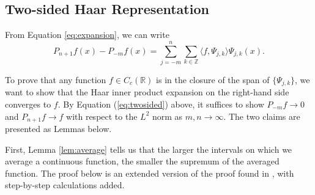 \documentclass[11pt]{amsart}
\theoremstyle{theorem} %
\theoremstyle{definition}
\theoremstyle{example}
\theoremstyle{remark}
\numberwithin{equation}{section}
\newcommand{\R}{\mathbb{R}}
\newcommand{\Z}{\mathbb{Z}}
\begin{document}
\subsection{Two-sided Haar Representation} \label{subsec:two-sided}
From Equation \ref{eq:expansion}, we can write
\begin{equation} \label{eq:twosided}
	P_{n+1}f(x) - P_{-m}f(x) = \sum_{j=-m}^{n} \sum_{k \in \Z} \langle f, \varPsi_{j,k} \rangle \varPsi_{j,k}(x).
\end{equation}

To prove that any function $ f \in C_c(\R) $ is in the closure of the span of $ \{ \varPsi_{j,k} \} $, we want to show that the Haar inner product expansion on the right-hand side converges to $ f $. By Equation (\ref{eq:twosided}) above, it suffices to show $ P_{-m}f \to 0 $ and $ P_{n+1}f \to f $ with respect to the $ L^2 $ norm as $ m, n \to \infty $. The two claims are presented as Lemmas below.

\vspace{8pt}
First, Lemma \ref{lem:average} tells us that the larger the intervals on which we average a continuous function, the smaller the supremum of the averaged function. The proof below is an extended version of the proof found in \cite{pinsky}, with step-by-step calculations added.
\end{document}

